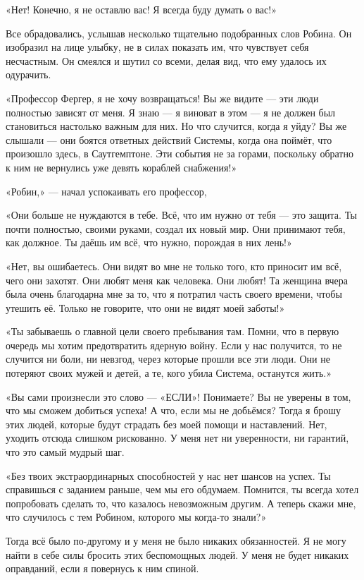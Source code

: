 \documentclass[a5paper, 9pt,
final, openany, twoside=true]{memoir}
\begin{document}
«Нет! Конечно, я не оставлю вас! Я всегда буду думать о вас!»

Все обрадовались, услышав несколько тщательно подобранных слов Робина. Он изобразил на лице улыбку, не в силах показать им, что чувствует себя несчастным. Он смеялся и шутил со всеми, делая вид, что ему удалось их одурачить.\bigskip

«Профессор Фергер, я не хочу возвращаться! Вы же видите — эти люди полностью зависят от меня. Я знаю — я виноват в этом — я не должен был становиться настолько важным для них. Но что случится, когда я уйду? Вы же слышали — они боятся ответных действий Системы, когда она поймёт, что произошло здесь, в Саутгемптоне. Эти события не за горами, поскольку обратно к ним не вернулись уже девять кораблей снабжения!»

«Робин,» — начал успокаивать его профессор,

«Они больше не нуждаются в тебе. Всё, что им нужно от тебя — это защита. Ты почти полностью, своими руками, создал их новый мир. Они принимают тебя, как должное. Ты даёшь им всё, что нужно, порождая в них лень!»

«Нет, вы ошибаетесь. Они видят во мне не только того, кто приносит им всё, чего они захотят. Они любят меня как человека. Они любят! Та женщина вчера была очень благодарна мне за то, что я потратил часть своего времени, чтобы утешить её. Только не говорите, что они не видят моей заботы!»

«Ты забываешь о главной цели своего пребывания там. Помни, что в первую очередь мы хотим предотвратить ядерную войну. Если у нас получится, то не случится ни боли, ни невзгод, через которые прошли все эти люди. Они не потеряют своих мужей и детей, а те, кого убила Система, останутся жить.»

«Вы сами произнесли это слово — «ЕСЛИ»! Понимаете? Вы не уверены в том, что мы сможем добиться успеха! А что, если мы не добьёмся? Тогда я брошу этих людей, которые будут страдать без моей помощи и наставлений. Нет, уходить отсюда слишком рискованно. У меня нет ни уверенности, ни гарантий, что это самый мудрый шаг.

«Без твоих экстраординарных способностей у нас нет шансов на успех. Ты справишься с заданием раньше, чем мы его обдумаем. Помнится, ты всегда хотел попробовать сделать то, что казалось невозможным другим. А теперь скажи мне, что случилось с тем Робином, которого мы когда-то знали?»

Тогда всё было по-другому и у меня не было никаких обязанностей. Я не могу найти в себе силы бросить этих беспомощных людей. У меня не будет никаких оправданий, если я повернусь к ним спиной.
\end{document}
